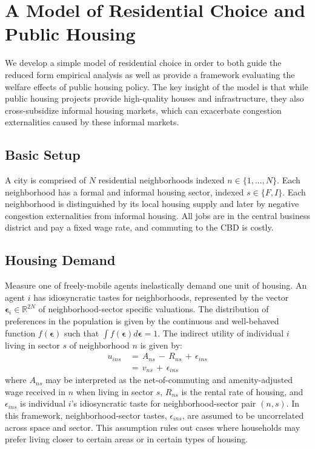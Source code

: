 \documentclass[12pt]{article}
\begin{document}
\section{A Model of Residential Choice and Public Housing}

We develop a simple model of residential choice in order to both guide the reduced form empirical analysis as well as provide a framework evaluating the welfare effects of public housing policy.  The key insight of the model is that while public housing projects provide high-quality houses and infrastructure, they also cross-subsidize informal housing markets, which can exacerbate congestion externalities caused by these informal markets.

\subsection*{Basic Setup}
A city is comprised of $N$ residential neighborhoods indexed $n\in\{1,...,N\}$.  Each neighborhood has a formal and informal housing sector, indexed $s\in\{F,I\}$.  Each neighborhood is distinguished by its local housing supply and later by negative congestion externalities from informal housing.  All jobs are in the central business district and pay a fixed wage rate, and commuting to the CBD is costly.

\subsection*{Housing Demand}

Measure one of freely-mobile agents inelastically demand one unit of housing. An agent $i$ has idiosyncratic tastes for neighborhoods, represented by the vector $\bm{\epsilon}_i \in \mathbb{R}^{2N}$ of neighborhood-sector specific valuations. The distribution of preferences in the population is given by the continuous and well-behaved function $f(\bm{\epsilon})$ such that $\int f(\bm{\epsilon}) d\bm{\epsilon} = 1$.
The indirect utility of individual $i$ living in sector $s$ of neighborhood $n$ is given by:
\begin{equation*}
\begin{aligned}
u_{ins} \,& =\, A_{ns}\,-\, R_{ns} \,+\, \epsilon_{ins} \\
        \,& =\, v_{ns} \,+\, \epsilon_{ins}
\end{aligned}
\end{equation*}
 where $A_{ns}$ may be interpreted as the net-of-commuting and amenity-adjusted wage received in $n$ when living in sector $s$, $R_{ns}$ is the rental rate of housing, and $\epsilon_{ins}$ is individual $i$'s idiosyncratic taste for neighborhood-sector pair $(n,s)$.  In this framework, neighborhood-sector tastes, $\epsilon_{ins}$, are assumed to be uncorrelated across space and sector.  This assumption rules out cases where households may prefer living closer to certain areas or in certain types of housing.
\end{document}
